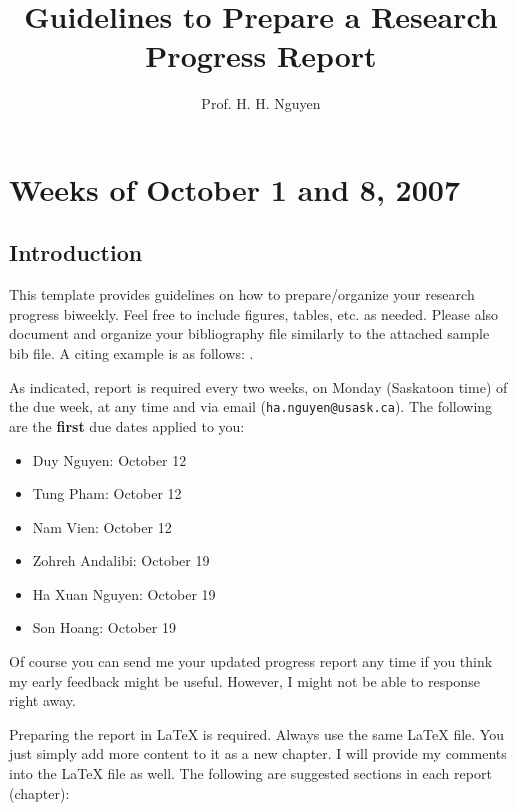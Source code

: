 \documentclass[11pt]{report}
\title{Guidelines to Prepare a Research Progress Report}
\author{Prof. H. H. Nguyen}
\begin{document}
\maketitle

 \chead{} 
 \cfoot{} 
\renewcommand{\footrulewidth}{1.0pt}
\renewcommand{\headrulewidth}{2.0pt}
\pagestyle{fancy}

\renewcommand{\thesection}{\arabic{section}}

\chapter{Weeks of October 1 and 8, 2007}

\section*{Introduction}

This template provides guidelines on how to prepare/organize your research progress biweekly. Feel free to include figures, tables, etc. as needed. Please also document and organize your bibliography file similarly to the attached sample bib file. A citing example is as follows: \cite{Nguyen0705,Alouini-TCOM-03-2000}.

As indicated, report is required every two weeks, on Monday (Saskatoon time) of the due week, at any time and via email (\verb"ha.nguyen@usask.ca"). The following are the \textbf{first} due dates applied to you:

\begin{itemize}
\item Duy Nguyen: October 12
\item Tung Pham:  October 12
\item Nam Vien:  October 12

\item Zohreh Andalibi:  October 19
\item Ha Xuan Nguyen:  October 19
\item Son Hoang:  October 19
\end{itemize}

Of course you can send me your updated progress report any time if you think my early feedback might be useful. However, I might not be able to response right away.

Preparing the report in \LaTeX\; is required. Always use the same \LaTeX\; file. You just simply add more content to it as a new chapter. I will provide my comments into the \LaTeX\; file as well. The following are suggested sections in each report (chapter):
\end{document}
